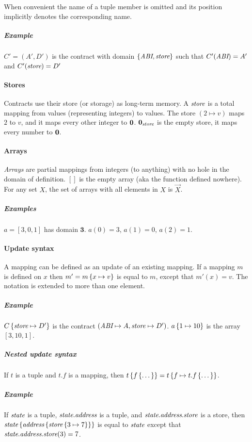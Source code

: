 \documentclass[12pt]{extarticle}
\begin{document}
\subparagraph{}
When convenient the name of a tuple member is omitted and its position implicitly denotes the corresponding name. 
\subparagraph{Example}
$C' = (A',D')$ is the contract with domain $\left\{\textit{ABI},\textit{store}\right\}$ such that $C'(\textit{ABI}) = A'$ and $C'(\textit{store}) = D'$

\paragraph{Stores} Contracts use their store (or storage) as long-term memory. A $\textit{store}$ is a total mapping from values (representing integers) to values. The store $(2\mapsto v)$ maps $2$ to $v$, and it maps every other integer to $\mathbf{0}$. $\mathbf{0}_\textit{store}$ is the empty store, it maps every number to $\mathbf{0}$.

\paragraph{Arrays}
\emph{Arrays} are partial mappings from integers (to anything) with no hole in the domain of definition. $[]$ is the empty array (aka the function defined nowhere). For any set $X$, the set of arrays with all elements in $X$ is $\vec X$.
\subparagraph{Examples}
$a = [3,0,1]$ has domain $\mathbf{3}$. $a(0) = 3$, $a(1) = 0$, $a(2) = 1$.

\def\Dom{\textrm{Dom}}
\paragraph{Update syntax}
A mapping can be defined as an update of an existing mapping. If a mapping $m$ is defined on $x$ then $m' = m\left\{x\mapsto v\right\}$ is equal to $m$, except that $m'(x) =v$. The notation is extended to more than one element.

\subparagraph{Example} $C\left\{\textit{store}\mapsto D'\right\}$ is the contract $(\textit{ABI}\mapsto A,\textit{store}\mapsto D')$. $a\left\{1\mapsto10\right\}$ is the array $[3,10,1]$.

\subparagraph{Nested update syntax} If $t$ is a tuple and $t.f$ is a mapping, then $t\left\{f\left\{\dots\right\}\right\} = t\left\{f\mapsto t.f\left\{\dots\right\}\right\}$.

\subparagraph{Example} If $\textit{state}$ is a tuple, $\textit{state}.\textit{address}$ is a tuple, and $\textit{state}.\textit{address}.\textit{store}$ is a store, then $\textit{state}\left\{\textit{address}\left\{\textit{store}\left\{3 \mapsto 7\right\}\right\}\right\}$ is equal to $\textit{state}$ except that $\textit{state}.\textit{address}.\textit{store}(3) = 7$.
\end{document}
